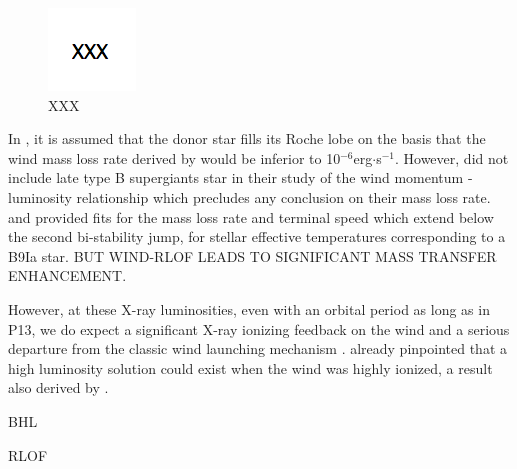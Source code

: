 \documentclass[letter]{aa}
\begin{document}
\begin{figure}
\centering
\includegraphics[width=0.99\columnwidth]{Pictures/BHL.png}
\caption{XXX}
\label{fig:BHL}
\end{figure}

In \cite{Motch2014}, it is assumed that the donor star fills its Roche lobe on the basis that the wind mass loss rate derived by \cite{Kudritzki1999} would be inferior to 10$^{-6}$erg$\cdot$s$^{-1}$. However, \cite{Kudritzki1999} did not include late type B supergiants star in their study of the wind momentum - luminosity relationship which precludes any conclusion on their mass loss rate. \cite{Vink2000} and \cite{Vink2001} provided fits for the mass loss rate and terminal speed which extend below the second bi-stability jump, for stellar effective temperatures corresponding to a B9Ia star. BUT WIND-RLOF LEADS TO SIGNIFICANT MASS TRANSFER ENHANCEMENT.

However, at these X-ray luminosities, even with an orbital period as long as in P13, we do expect a significant X-ray ionizing feedback on the wind and a serious departure from the classic wind launching mechanism \citep{Hatchett1977,Stevens1991}. \cite{Ho1987} already pinpointed that a high luminosity solution could exist when the wind was highly ionized, a result also derived by \cite{Karino2014}.

BHL

RLOF
\end{document}
